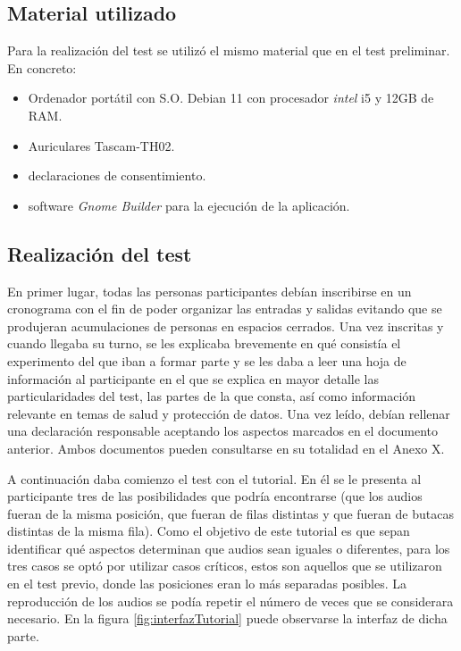 \documentclass[11pt,a4paper,twoside]{book}
\begin{document}
            \subsection*{Material utilizado}
                Para la realización del test se utilizó el mismo material que en el test preliminar. En concreto:
                \begin{itemize}
                    \item Ordenador portátil con S.O. Debian 11 con procesador \textit{intel} i5 y 12GB de RAM.
                    \item Auriculares Tascam-TH02.
                    \item declaraciones de consentimiento.
                    \item software \textit{Gnome Builder} para la ejecución de la aplicación.
                \end{itemize}
                
            \subsection*{Realización del test}
                En primer lugar, todas las personas participantes debían inscribirse en un cronograma con el fin de poder organizar las entradas y salidas evitando que se produjeran acumulaciones de personas en espacios cerrados. Una vez inscritas y cuando llegaba su turno, se les explicaba brevemente en qué consistía el experimento del que iban a formar parte y se les daba a leer una hoja de información al participante en el que se explica en mayor detalle las particularidades del test, las partes de la que consta, así como información relevante en temas de salud y protección de datos. Una vez leído, debían rellenar una declaración responsable aceptando los aspectos marcados en el documento anterior. Ambos documentos pueden consultarse en su totalidad en el Anexo X.
                
                A continuación daba comienzo el test con el tutorial. En él se le presenta al participante tres de las posibilidades que podría encontrarse (que los audios fueran de la misma posición, que fueran de filas distintas y que fueran de butacas distintas de la misma fila). Como el objetivo de este tutorial es que sepan identificar qué aspectos determinan que audios sean iguales o diferentes, para los tres casos se optó por utilizar casos críticos, estos son aquellos que se utilizaron en el test previo, donde las posiciones eran lo más separadas posibles. La reproducción de los audios se podía repetir el número de veces que se considerara necesario. En la figura \ref{fig:interfazTutorial} puede observarse la interfaz de dicha parte.
                
\end{document}
